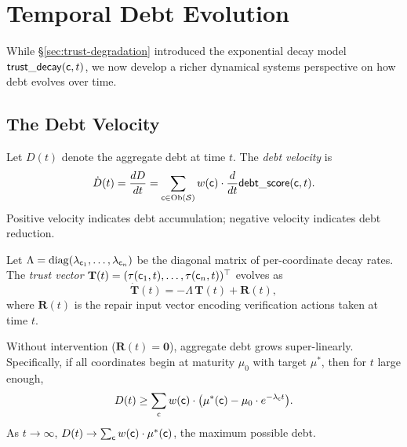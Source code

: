 \documentclass[11pt]{article}
\newcommand{\DebtScore}{\mathsf{debt\_score}}
\newcommand{\TrustDecay}{\mathsf{trust\_decay}}
\begin{document}
\section{Temporal Debt Evolution}\label{sec:temporal-evolution}

While \S\ref{sec:trust-degradation} introduced the exponential decay
model $\TrustDecay(\coord, t)$, we now develop a richer dynamical
systems perspective on how debt evolves over time.

\subsection{The Debt Velocity}\label{subsec:debt-velocity}

\begin{definition}\label{def:debt-velocity}
Let $D(t)$ denote the aggregate debt at time $t$.  The \emph{debt
velocity} is
\[
  \dot{D}(t) = \frac{dD}{dt} = \sum_{\coord \in \Ob(\Site)}
  w(\coord) \cdot \frac{d}{dt}\DebtScore(\coord, t).
\]
Positive velocity indicates debt accumulation; negative velocity
indicates debt reduction.
\end{definition}

\begin{definition}\label{def:decay-matrix}
Let $\Lambda = \mathrm{diag}(\lambda_{\mathsf{c}_1}, \ldots,
\lambda_{\mathsf{c}_n})$ be the diagonal matrix of per-coordinate
decay rates.  The \emph{trust vector} $\mathbf{T}(t) =
(\tau(\mathsf{c}_1, t), \ldots, \tau(\mathsf{c}_n, t))^\top$ evolves as
\[
  \dot{\mathbf{T}}(t) = -\Lambda \, \mathbf{T}(t) + \mathbf{R}(t),
\]
where $\mathbf{R}(t)$ is the repair input vector encoding
verification actions taken at time $t$.
\end{definition}

\begin{theorem}\label{thm:superlinear}
Without intervention ($\mathbf{R}(t) = \mathbf{0}$), aggregate debt
grows super-linearly.  Specifically, if all coordinates begin at
maturity $\mu_0$ with target $\mu^*$, then for $t$ large enough,
\[
  D(t) \geq \sum_{\mathsf{c}} w(\mathsf{c}) \cdot
  \bigl(\mu^*(\mathsf{c}) - \mu_0 \cdot e^{-\lambda_{\mathsf{c}} t}\bigr).
\]
As $t \to \infty$, $D(t) \to \sum_{\mathsf{c}} w(\mathsf{c}) \cdot \mu^*(\mathsf{c})$,
the maximum possible debt.
\end{theorem}
\end{document}
